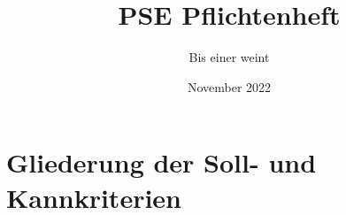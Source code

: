 \documentclass{article}
\title{PSE Pflichtenheft}
\author{Bis einer weint}
\date{November 2022}
\begin{document}
\maketitle

\section{Gliederung der Soll- und Kannkriterien}
\end{document}
